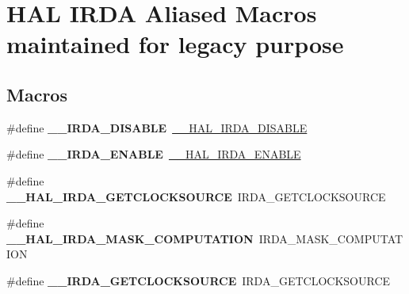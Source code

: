 \hypertarget{group___h_a_l___i_r_d_a___aliased___macros}{}\section{H\+AL I\+R\+DA Aliased Macros maintained for legacy purpose}
\label{group___h_a_l___i_r_d_a___aliased___macros}
\subsection*{Macros}
\begin{DoxyCompactItemize}
\item 
\#define {\bfseries \+\_\+\+\_\+\+I\+R\+D\+A\+\_\+\+D\+I\+S\+A\+B\+LE}~\hyperlink{group___i_r_d_a___exported___macros_gaf049a81f535415532182a2bb10cbee1d}{\+\_\+\+\_\+\+H\+A\+L\+\_\+\+I\+R\+D\+A\+\_\+\+D\+I\+S\+A\+B\+LE}\hypertarget{group___h_a_l___i_r_d_a___aliased___macros_gae107b46fa75a7f1f5eb0734cbb24e997}{}\label{group___h_a_l___i_r_d_a___aliased___macros_gae107b46fa75a7f1f5eb0734cbb24e997}

\item 
\#define {\bfseries \+\_\+\+\_\+\+I\+R\+D\+A\+\_\+\+E\+N\+A\+B\+LE}~\hyperlink{group___i_r_d_a___exported___macros_ga94d14e3105494108f4ba6f69aa1728a7}{\+\_\+\+\_\+\+H\+A\+L\+\_\+\+I\+R\+D\+A\+\_\+\+E\+N\+A\+B\+LE}\hypertarget{group___h_a_l___i_r_d_a___aliased___macros_ga30e950fea9b8b878eb721ef488572f93}{}\label{group___h_a_l___i_r_d_a___aliased___macros_ga30e950fea9b8b878eb721ef488572f93}

\item 
\#define {\bfseries \+\_\+\+\_\+\+H\+A\+L\+\_\+\+I\+R\+D\+A\+\_\+\+G\+E\+T\+C\+L\+O\+C\+K\+S\+O\+U\+R\+CE}~I\+R\+D\+A\+\_\+\+G\+E\+T\+C\+L\+O\+C\+K\+S\+O\+U\+R\+CE\hypertarget{group___h_a_l___i_r_d_a___aliased___macros_ga914579d3d8a0ebefab093a54a60bdef4}{}\label{group___h_a_l___i_r_d_a___aliased___macros_ga914579d3d8a0ebefab093a54a60bdef4}

\item 
\#define {\bfseries \+\_\+\+\_\+\+H\+A\+L\+\_\+\+I\+R\+D\+A\+\_\+\+M\+A\+S\+K\+\_\+\+C\+O\+M\+P\+U\+T\+A\+T\+I\+ON}~I\+R\+D\+A\+\_\+\+M\+A\+S\+K\+\_\+\+C\+O\+M\+P\+U\+T\+A\+T\+I\+ON\hypertarget{group___h_a_l___i_r_d_a___aliased___macros_ga5dfede2931b25ae470e8b9222cd7f276}{}\label{group___h_a_l___i_r_d_a___aliased___macros_ga5dfede2931b25ae470e8b9222cd7f276}

\item 
\#define {\bfseries \+\_\+\+\_\+\+I\+R\+D\+A\+\_\+\+G\+E\+T\+C\+L\+O\+C\+K\+S\+O\+U\+R\+CE}~I\+R\+D\+A\+\_\+\+G\+E\+T\+C\+L\+O\+C\+K\+S\+O\+U\+R\+CE\hypertarget{group___h_a_l___i_r_d_a___aliased___macros_ga91d8bac965400b5b1e0a9be356a9e477}{}\label{group___h_a_l___i_r_d_a___aliased___macros_ga91d8bac965400b5b1e0a9be356a9e477}


\end{DoxyCompactItemize}
